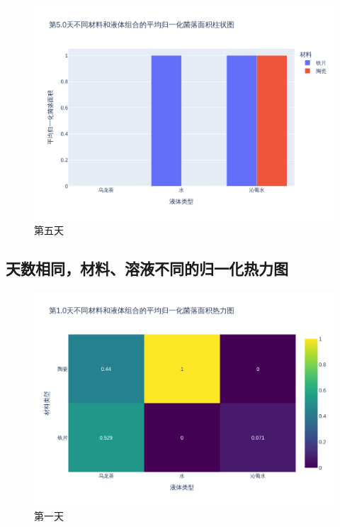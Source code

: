 \documentclass[12pt,a4paper]{ctexart}
\begin{document}
\begin{figure}[H]  %
    \centering  %
    \includegraphics[width=\textwidth]{./plot/SingleDay/bar_normalized_day5.0.png}  %
    \caption{第五天}  %
    \label{fig:SingleDayBar5}  %
\end{figure}
\subsection{天数相同，材料、溶液不同的归一化热力图}
\begin{figure}[H]  %
    \centering  %
    \includegraphics[width=\textwidth]{./plot/SingleDay/heatmap_normalized_day1.0.png}  %
    \caption{第一天}  %
    \label{fig:SingleDayHeat1}  %
\end{figure}
\end{document}
